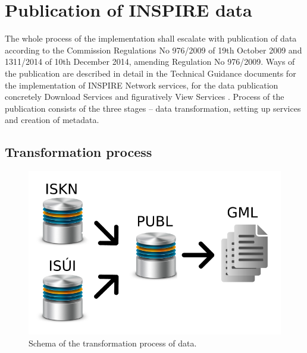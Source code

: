 \documentclass[eprint]{actapoly}
\begin{document}
\section{Publication of INSPIRE data}
\label{sec:publication}

The whole process of the implementation shall escalate with publication of data according to the Commission Regulations No 976/2009 of 19th October 2009 and 1311/2014 of 10th December 2014, amending Regulation No 976/2009. Ways of the publication are described in detail in the Technical Guidance documents for the implementation of INSPIRE Network services, for the data publication concretely Download Services and figuratively View Services \cite{INSPIRE:NS}. Process of the publication consists of the three stages -- data transformation, setting up services and creation of metadata.

\subsection{Transformation process}

\begin{figure}
\centering
\includegraphics[width=0.8\linewidth]{pics/transformace.png} %
\caption{Schema of the transformation process of data.}
\label{fig:transformation}
\end{figure}
\end{document}
